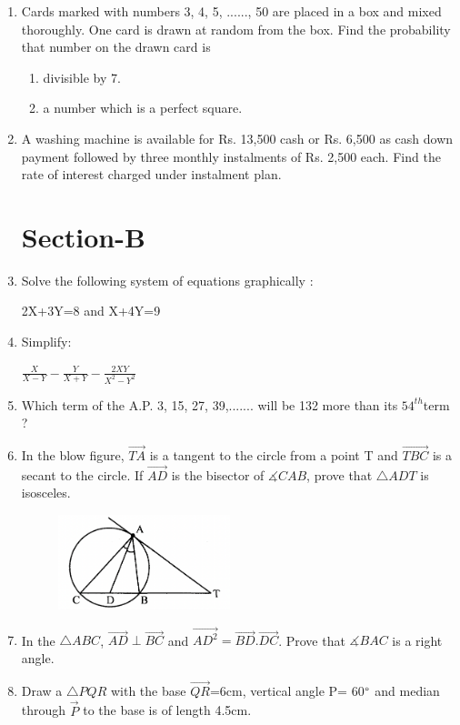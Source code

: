 \documentclass[journal,12pt,twocolumn]{IEEEtran}
\begin{document}
\begin{enumerate}
\begin{figure}[h!]
 \end{figure}
 \medskip
\item Cards marked with numbers 3, 4, 5, ......, 50 are placed in a box and mixed thoroughly. One card is drawn at random from the box. Find the probability that number on the drawn card is
\begin{enumerate}
\item divisible by 7.
\item a number which is a perfect square.
\end{enumerate}
 \medskip
\item A washing machine is available for Rs. 13,500 cash or Rs. 6,500 as cash down payment followed by three monthly instalments of Rs. 2,500 each. Find the rate of interest charged under instalment plan.
\bigskip
\section{Section-B}
\item Solve the following system of equations graphically :
\begin{center}
2X+3Y=8 and X+4Y=9
\end{center}
\medskip
\item Simplify:
\begin{center}
$\displaystyle\frac{X}{X-Y}-\displaystyle\frac{Y}{X+Y}-\displaystyle\frac{2XY}{X^2-Y^2}$
\end{center}
\medskip
\item Which term of the A.P. 3, 15, 27, 39,....... will be 132 more than its $54^{th} $term ?
\medskip
\item In the blow figure, $\vec{TA}$ is a tangent to the circle from a point T and $\vec{TBC}$ is a secant to the circle. If $\vec{AD}$ is the bisector of $\measuredangle{CAB} $, prove that $\triangle{ADT} $ is isosceles.
\begin{figure}[h!]
    \centering
    \includegraphics[width=5cm]{6.png}
 \end{figure}
 \medskip
 \item In  the $\triangle{ABC}$, $\vec{AD} \perp \vec{BC}$ and $\vec{AD^2}= \vec{BD}.\vec{DC}$.  Prove that $\measuredangle{BAC}$ is a right angle.
 \medskip 
 \item Draw a $\triangle{PQR}$ with the base $\vec{QR}$=6cm, vertical angle P= 60$\degree$ and median through $\vec{P}$ to the base is of length 4.5cm.

\end{enumerate}
\end{document}
